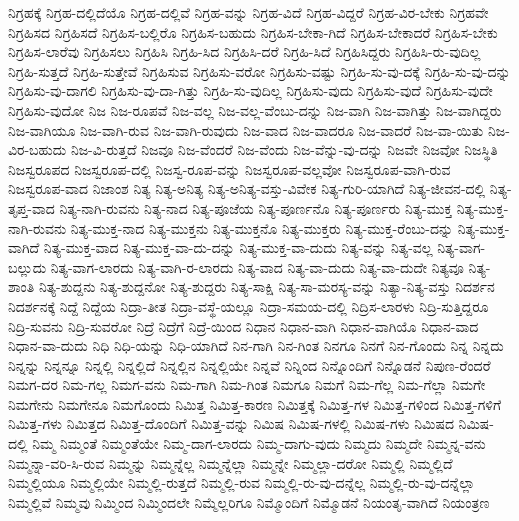 {ನಿಗ್ರಹಕ್ಕೆ
ನಿಗ್ರಹ-ದಲ್ಲಿದೆಯೊ
ನಿಗ್ರಹ-ದಲ್ಲಿವೆ
ನಿಗ್ರಹ-ವನ್ನು
ನಿಗ್ರಹ-ವಿದೆ
ನಿಗ್ರಹ-ವಿದ್ದರೆ
ನಿಗ್ರಹ-ವಿರ-ಬೇಕು
ನಿಗ್ರಹವೇ
ನಿಗ್ರಹಿಸದ
ನಿಗ್ರಹಿಸದೆ
ನಿಗ್ರಹಿಸ-ಬಲ್ಲಿರೊ
ನಿಗ್ರಹಿಸ-ಬಹುದು
ನಿಗ್ರಹಿಸ-ಬೇಕಾ-ಗಿದೆ
ನಿಗ್ರಹಿಸ-ಬೇಕಾದರೆ
ನಿಗ್ರಹಿಸ-ಬೇಕು
ನಿಗ್ರಹಿಸ-ಲಾರೆವು
ನಿಗ್ರಹಿಸಲು
ನಿಗ್ರಹಿಸಿ
ನಿಗ್ರಹಿ-ಸಿದ
ನಿಗ್ರಹಿಸಿ-ದರೆ
ನಿಗ್ರಹಿ-ಸಿದೆ
ನಿಗ್ರಹಿಸಿದ್ದರು
ನಿಗ್ರಹಿಸಿ-ರು-ವುದಿಲ್ಲ
ನಿಗ್ರಹಿ-ಸುತ್ತದೆ
ನಿಗ್ರಹಿ-ಸುತ್ತೇವೆ
ನಿಗ್ರಹಿಸುವ
ನಿಗ್ರಹಿಸು-ವರೋ
ನಿಗ್ರಹಿಸು-ವಷ್ಟು
ನಿಗ್ರಹಿ-ಸು-ವು-ದಕ್ಕೆ
ನಿಗ್ರಹಿ-ಸು-ವು-ದನ್ನು
ನಿಗ್ರಹಿಸು-ವು-ದಾಗಲಿ
ನಿಗ್ರಹಿಸು-ವು-ದಾ-ಗಿತ್ತು
ನಿಗ್ರಹಿ-ಸು-ವುದಿಲ್ಲ
ನಿಗ್ರಹಿಸು-ವುದು
ನಿಗ್ರಹಿಸು-ವುದೆ
ನಿಗ್ರಹಿಸು-ವುದೇ
ನಿಗ್ರಹಿಸು-ವುದೋ
ನಿಜ
ನಿಜ-ರೂಪವೆ
ನಿಜ-ವಲ್ಲ
ನಿಜ-ವಲ್ಲ-ವೆಂಬು-ದನ್ನು
ನಿಜ-ವಾಗಿ
ನಿಜ-ವಾಗಿತ್ತು
ನಿಜ-ವಾಗಿದ್ದರು
ನಿಜ-ವಾಗಿಯೂ
ನಿಜ-ವಾಗಿ-ರುವ
ನಿಜ-ವಾಗಿ-ರುವುದು
ನಿಜ-ವಾದ
ನಿಜ-ವಾದರೂ
ನಿಜ-ವಾದರೆ
ನಿಜ-ವಾ-ಯಿತು
ನಿಜ-ವಿರ-ಬಹುದು
ನಿಜ-ವಿ-ರುತ್ತದೆ
ನಿಜವೂ
ನಿಜ-ವೆಂದರೆ
ನಿಜ-ವೆಂದು
ನಿಜ-ವೆನ್ನು-ವು-ದನ್ನು
ನಿಜವೇ
ನಿಜವೋ
ನಿಜಸ್ಥಿತಿ
ನಿಜಸ್ವರೂಪದ
ನಿಜಸ್ವರೂಪ-ದಲ್ಲಿ
ನಿಜಸ್ವ-ರೂಪ-ವನ್ನು
ನಿಜಸ್ವರೂಪ-ವಲ್ಲವೋ
ನಿಜಸ್ವರೂಪ-ವಾಗಿ-ರುವ
ನಿಜಸ್ವರೂಪ-ವಾದ
ನಿಜಾಂಶ
ನಿತ್ಯ
ನಿತ್ಯ-ಅನಿತ್ಯ
ನಿತ್ಯ-ಅನಿತ್ಯ-ವಸ್ತು-ವಿವೇಕ
ನಿತ್ಯ-ಗುರಿ-ಯಾಗಿದೆ
ನಿತ್ಯ-ಜೀವನ-ದಲ್ಲಿ
ನಿತ್ಯ-ತೃಪ್ತ-ವಾದ
ನಿತ್ಯ-ನಾಗಿ-ರುವನು
ನಿತ್ಯ-ನಾದ
ನಿತ್ಯ-ಪೂಜೆಯ
ನಿತ್ಯ-ಪೂರ್ಣನೊ
ನಿತ್ಯ-ಪೂರ್ಣರು
ನಿತ್ಯ-ಮುಕ್ತ
ನಿತ್ಯ-ಮುಕ್ತ-ನಾಗಿ-ರುವನು
ನಿತ್ಯ-ಮುಕ್ತ-ನಾದ
ನಿತ್ಯ-ಮುಕ್ತನು
ನಿತ್ಯ-ಮುಕ್ತನೊ
ನಿತ್ಯ-ಮುಕ್ತರು
ನಿತ್ಯ-ಮುಕ್ತ-ರೆಂಬು-ದನ್ನು
ನಿತ್ಯ-ಮುಕ್ತ-ವಾಗಿದೆ
ನಿತ್ಯ-ಮುಕ್ತ-ವಾದ
ನಿತ್ಯ-ಮುಕ್ತ-ವಾ-ದು-ದನ್ನು
ನಿತ್ಯ-ಮುಕ್ತ-ವಾ-ದುದು
ನಿತ್ಯ-ವನ್ನು
ನಿತ್ಯ-ವಲ್ಲ
ನಿತ್ಯ-ವಾಗ-ಬಲ್ಲುದು
ನಿತ್ಯ-ವಾಗ-ಲಾರದು
ನಿತ್ಯ-ವಾಗಿ-ರ-ಲಾರದು
ನಿತ್ಯ-ವಾದ
ನಿತ್ಯ-ವಾ-ದುದು
ನಿತ್ಯ-ವಾ-ದುದೇ
ನಿತ್ಯವೂ
ನಿತ್ಯ-ಶಾಂತಿ
ನಿತ್ಯ-ಶುದ್ದನು
ನಿತ್ಯ-ಶುದ್ದನೋ
ನಿತ್ಯ-ಶುದ್ದರು
ನಿತ್ಯ-ಸಾಕ್ಷಿ
ನಿತ್ಯ-ಸಾ-ಮರಸ್ಯ-ವನ್ನು
ನಿತ್ಯಾ-ನಿತ್ಯ-ವಸ್ತು
ನಿದರ್ಶನ
ನಿದರ್ಶನಕ್ಕೆ
ನಿದ್ದೆ
ನಿದ್ದೆಯ
ನಿದ್ರಾ-ತೀತ
ನಿದ್ರಾ-ವಸ್ಥೆ-ಯಲ್ಲೂ
ನಿದ್ರಾ-ಸಮಯ-ದಲ್ಲಿ
ನಿದ್ರಿಸ-ಲಾರಳು
ನಿದ್ರಿ-ಸುತ್ತಿದ್ದರೂ
ನಿದ್ರಿ-ಸುವನು
ನಿದ್ರಿ-ಸುವರೋ
ನಿದ್ರೆ
ನಿದ್ರೆಗೆ
ನಿದ್ರೆ-ಯಿಂದ
ನಿಧಾನ
ನಿಧಾನ-ವಾಗಿ
ನಿಧಾನ-ವಾಗಿಯೊ
ನಿಧಾನ-ವಾದ
ನಿಧಾನ-ವಾ-ದುದು
ನಿಧಿ
ನಿಧಿ-ಯನ್ನು
ನಿಧಿ-ಯಾಗಿದೆ
ನಿನ-ಗಾಗಿ
ನಿನ-ಗಿಂತ
ನಿನಗೂ
ನಿನಗೆ
ನಿನ-ಗೊಂದು
ನಿನ್ನ
ನಿನ್ನದು
ನಿನ್ನನ್ನು
ನಿನ್ನನ್ನೂ
ನಿನ್ನಲ್ಲಿ
ನಿನ್ನಲ್ಲಿದೆ
ನಿನ್ನಲ್ಲಿನ
ನಿನ್ನಲ್ಲಿಯೇ
ನಿನ್ನವೆ
ನಿನ್ನಿಂದ
ನಿನ್ನೊಂದಿಗೆ
ನಿನ್ನೊಡನೆ
ನಿಪುಣ-ರೆಂದರೆ
ನಿಮಗ-ದರ
ನಿಮ-ಗಲ್ಲ
ನಿಮಗ-ವನು
ನಿಮ-ಗಾಗಿ
ನಿಮ-ಗಿಂತ
ನಿಮಗೂ
ನಿಮಗೆ
ನಿಮ-ಗೆಲ್ಲ
ನಿಮ-ಗೆಲ್ಲಾ
ನಿಮಗೇ
ನಿಮಗೇನು
ನಿಮಗೇನೂ
ನಿಮಗೊಂದು
ನಿಮಿತ್ತ
ನಿಮಿತ್ತ-ಕಾರಣ
ನಿಮಿತ್ತಕ್ಕೆ
ನಿಮಿತ್ತ-ಗಳ
ನಿಮಿತ್ತ-ಗಳಿಂದ
ನಿಮಿತ್ತ-ಗಳಿಗೆ
ನಿಮಿತ್ತ-ಗಳು
ನಿಮಿತ್ತದ
ನಿಮಿತ್ತ-ದೊಂದಿಗೆ
ನಿಮಿತ್ತ-ವನ್ನು
ನಿಮಿಷ
ನಿಮಿಷ-ಗಳಲ್ಲಿ
ನಿಮಿಷ-ಗಳು
ನಿಮಿಷದ
ನಿಮಿಷ-ದಲ್ಲಿ
ನಿಮ್ಮ
ನಿಮ್ಮಂತೆ
ನಿಮ್ಮಂತೆಯೇ
ನಿಮ್ಮ-ದಾಗ-ಲಾರದು
ನಿಮ್ಮ-ದಾಗು-ವುದು
ನಿಮ್ಮದು
ನಿಮ್ಮದೇ
ನಿಮ್ಮನ್ನ-ವನು
ನಿಮ್ಮನ್ನಾ-ವರಿ-ಸಿ-ರುವ
ನಿಮ್ಮನ್ನು
ನಿಮ್ಮನ್ನೆಲ್ಲ
ನಿಮ್ಮನ್ನೆಲ್ಲಾ
ನಿಮ್ಮನ್ನೇ
ನಿಮ್ಮಲ್ಲಾ-ದರೋ
ನಿಮ್ಮಲ್ಲಿ
ನಿಮ್ಮಲ್ಲಿದೆ
ನಿಮ್ಮಲ್ಲಿಯೂ
ನಿಮ್ಮಲ್ಲಿಯೇ
ನಿಮ್ಮಲ್ಲಿ-ರುತ್ತದೆ
ನಿಮ್ಮಲ್ಲಿ-ರುವ
ನಿಮ್ಮಲ್ಲಿ-ರು-ವು-ದನ್ನೆಲ್ಲ
ನಿಮ್ಮಲ್ಲಿ-ರು-ವು-ದನ್ನೆಲ್ಲಾ
ನಿಮ್ಮಲ್ಲಿವೆ
ನಿಮ್ಮವು
ನಿಮ್ಮಿಂದ
ನಿಮ್ಮಿಂದಲೇ
ನಿಮ್ಮೆಲ್ಲರಿಗೂ
ನಿಮ್ಮೊಂದಿಗೆ
ನಿಮ್ಮೊಡನೆ
ನಿಯಂತೃ-ವಾಗಿದೆ
ನಿಯಂತ್ರಣ
}
